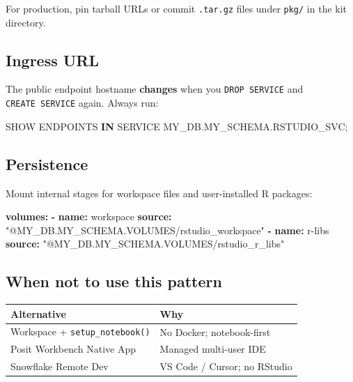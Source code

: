 \documentclass[
]{article}
\newenvironment{Shaded}{\begin{snugshade}}{\end{snugshade}}
\newcommand{\AttributeTok}[1]{\textcolor[rgb]{0.13,0.29,0.53}{#1}}
\newcommand{\FunctionTok}[1]{\textcolor[rgb]{0.13,0.29,0.53}{\textbf{#1}}}
\newcommand{\KeywordTok}[1]{\textcolor[rgb]{0.13,0.29,0.53}{\textbf{#1}}}
\newcommand{\NormalTok}[1]{#1}
\newcommand{\StringTok}[1]{\textcolor[rgb]{0.31,0.60,0.02}{#1}}
\begin{document}
For production, pin tarball URLs or commit \texttt{.tar.gz} files under
\texttt{pkg/} in the kit directory.

\subsection{Ingress URL}\label{ingress-url}

The public endpoint hostname \textbf{changes} when you
\texttt{DROP\ SERVICE} and \texttt{CREATE\ SERVICE} again. Always run:

\begin{Shaded}
\begin{Highlighting}[]
\NormalTok{SHOW ENDPOINTS }\KeywordTok{IN}\NormalTok{ SERVICE MY\_DB.MY\_SCHEMA.RSTUDIO\_SVC;}
\end{Highlighting}
\end{Shaded}

\subsection{Persistence}\label{persistence}

Mount internal stages for workspace files and user-installed R packages:

\begin{Shaded}
\begin{Highlighting}[]
\FunctionTok{volumes}\KeywordTok{:}
\KeywordTok{{-}}\AttributeTok{ }\FunctionTok{name}\KeywordTok{:}\AttributeTok{ workspace}
\AttributeTok{  }\FunctionTok{source}\KeywordTok{:}\AttributeTok{ }\StringTok{"@MY\_DB.MY\_SCHEMA.VOLUMES/rstudio\_workspace"}
\KeywordTok{{-}}\AttributeTok{ }\FunctionTok{name}\KeywordTok{:}\AttributeTok{ r{-}libs}
\AttributeTok{  }\FunctionTok{source}\KeywordTok{:}\AttributeTok{ }\StringTok{"@MY\_DB.MY\_SCHEMA.VOLUMES/rstudio\_r\_libs"}
\end{Highlighting}
\end{Shaded}

\subsection{When not to use this
pattern}\label{when-not-to-use-this-pattern}

\begin{longtable}[]{@{}ll@{}}
\toprule\noalign{}
Alternative & Why \\
\midrule\noalign{}
\endhead
\bottomrule\noalign{}
\endlastfoot
Workspace + \texttt{setup\_notebook()} & No Docker; notebook-first \\
Posit Workbench Native App & Managed multi-user IDE \\
Snowflake Remote Dev & VS Code / Cursor; no RStudio \\
\end{longtable}
\end{document}
